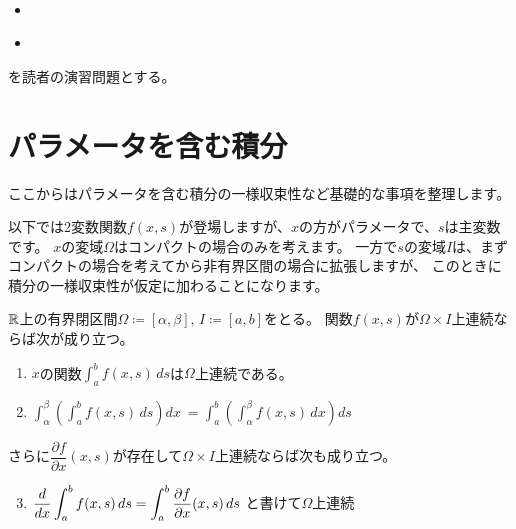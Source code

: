 \documentclass[report]{jlreq}
\begin{document}
\begin{problem}
    \,
    \begin{itemize}
        \item \cite[第III章 例題3.3]{杉浦+89}
        \item \cite[第III章 問11.1 (1)-(4)]{杉浦+89}
    \end{itemize}
    を読者の演習問題とする。
\end{problem}


%
\section{パラメータを含む積分}

ここからはパラメータを含む積分の一様収束性など基礎的な事項を整理します。

以下では\mbox{2変数}関数$f(x, s)$が登場しますが、$x$の方がパラメータで、$s$は主変数です。
$x$の変域$\Omega$はコンパクトの場合のみを考えます。
一方で$s$の変域$I$は、まずコンパクトの場合を考えてから非有界区間の場合に拡張しますが、
このときに積分の一様収束性が仮定に加わることになります。

\begin{theorem}[$I$がコンパクトの場合]
    $\mathbb{R}$上の有界閉区間$\Omega \coloneq [\alpha, \beta],\, I \coloneq [a, b]$をとる。
    関数$f(x, s)$が$\Omega \times I$上連続ならば次が成り立つ。
    \begin{enumerate}
        \vspace{1em}
        \item $x$の関数$\displaystyle \int_a^b f(x, s)\, ds$は$\Omega$上連続である。
        \item $\displaystyle \int_\alpha^\beta \left( \int_a^b f(x, s)\, ds \right) dx \
            = \int_a^b \left( \int_\alpha^\beta f(x, s)\, dx \right) ds$
        \vspace{1em}
    \end{enumerate}
    さらに$\dfrac{\partial f}{\partial x}(x, s)$が存在して$\Omega \times I$上連続ならば次も成り立つ。
    \begin{enumerate}
        \setcounter{enumi}{2}
        \vspace{1em}
        \item $\displaystyle \dd{x} \int_a^b f(x, s)\, ds = \int_a^b \deldel[f]{x}(x, s)\, ds$
            と書けて$\Omega$上連続
    \end{enumerate}
    \label{4:thm:1}
\end{theorem}
\end{document}

